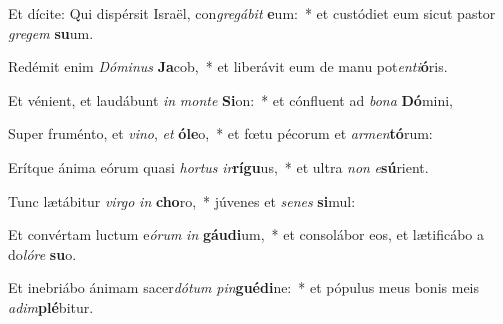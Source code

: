 \item Et dícite: Qui dispérsit Israël, con\textit{gre}\textit{gá}\textit{bit} \textbf{e}um:~* et custódiet eum sicut pastor \textit{gre}\textit{gem} \textbf{su}um.
\item Redémit enim \textit{Dó}\textit{mi}\textit{nus} \textbf{Ja}cob,~* et liberávit eum de manu pot\textit{en}\textit{ti}\textbf{ó}ris.
\item Et vénient, et laudábunt \textit{in} \textit{mon}\textit{te} \textbf{Si}on:~* et cónfluent ad \textit{bo}\textit{na} \textbf{Dó}mini,
\item Super fruménto, et \textit{vi}\textit{no}, \textit{et} \textbf{ó}\textbf{le}o,~* et fœtu pécorum et \textit{ar}\textit{men}\textbf{tó}rum:
\item Erítque ánima eórum quasi \textit{hor}\textit{tus} \textit{ir}\textbf{rí}\textbf{gu}us,~* et ultra \textit{non} \textit{e}\textbf{sú}rient.
\item Tunc lætábitur \textit{vir}\textit{go} \textit{in} \textbf{cho}ro,~* júvenes et \textit{se}\textit{nes} \textbf{si}mul:
\item Et convértam luctum e\textit{ó}\textit{rum} \textit{in} \textbf{gáu}\textbf{di}um,~* et consolábor eos, et lætificábo a do\textit{ló}\textit{re} \textbf{su}o.
\item Et inebriábo ánimam sacer\textit{dó}\textit{tum} \textit{pin}\textbf{gué}\textbf{di}ne:~* et pópulus meus bonis meis \textit{ad}\textit{im}\textbf{plé}bitur.
